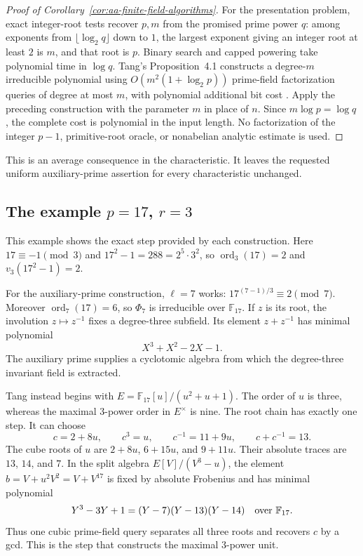 \documentclass[11pt]{article}
\theoremstyle{definition}
\theoremstyle{remark}
\begin{document}
\begin{proof}[Proof of Corollary~\ref{cor:aa-finite-field-algorithms}]
For the presentation problem, exact integer-root tests recover
\(p,m\) from the promised prime power \(q\): among exponents from
\(\lfloor\log_2q\rfloor\) down to \(1\), the largest exponent giving
an integer root at least \(2\) is \(m\), and that root is \(p\).
Binary search and capped powering take polynomial time in
\(\log q\). Tang's Proposition~4.1 constructs a degree-\(m\)
irreducible polynomial using
\(O(m^2(1+\log_2p))\) prime-field factorization queries of
degree at most \(m\), with polynomial additional bit cost
\citep[pp.~5--7]{Tang2026}.
Apply the preceding construction with the parameter \(m\)
in place of \(n\). Since \(m\log p=\log q\), the complete cost
is polynomial in the input length. No factorization of the
integer \(p-1\), primitive-root oracle, or nonabelian analytic
estimate is used.
\end{proof}

This is an average consequence in the characteristic. It leaves the
requested uniform auxiliary-prime assertion for every characteristic
unchanged.


\subsection{The example \texorpdfstring{$p=17$, $r=3$}{p=17, r=3}}

This example shows the exact step provided by each construction.
Here $17\equiv-1\pmod3$ and
$17^2-1=288=2^5\cdot3^2$, so
$\operatorname{ord}_3(17)=2$ and $v_3(17^2-1)=2$.

For the auxiliary-prime construction, $\ell=7$ works:
$17^{(7-1)/3}\equiv2\pmod7$. Moreover
$\operatorname{ord}_7(17)=6$, so $\Phi_7$ is irreducible over
$\mathbb F_{17}$. If $z$ is its root, the involution
$z\mapsto z^{-1}$ fixes a degree-three subfield. Its element
$z+z^{-1}$ has minimal polynomial
\[
 X^3+X^2-2X-1.
\]
The auxiliary prime supplies a cyclotomic algebra from which the
degree-three invariant field is extracted.

Tang instead begins with
$E=\mathbb F_{17}[u]/(u^2+u+1)$. The order of $u$ is three,
whereas the maximal $3$-power order in $E^\times$ is nine.
The root chain has exactly one step. It can choose
\[
 c=2+8u,\qquad c^3=u,\qquad
 c^{-1}=11+9u,\qquad c+c^{-1}=13.
\]
The cube roots of $u$ are $2+8u$, $6+15u$, and $9+11u$.
Their absolute traces are $13$, $14$, and $7$. In the split
algebra $E[V]/(V^3-u)$, the element
$b=V+u^2V^2=V+V^{17}$ is fixed by absolute Frobenius and has
minimal polynomial
\[
 Y^3-3Y+1=(Y-7)(Y-13)(Y-14)
       \quad\hbox{over }\mathbb F_{17}.
\]
Thus one cubic prime-field query separates all three roots and
recovers $c$ by a gcd. This is the step that constructs the
maximal $3$-power unit.
\end{document}
